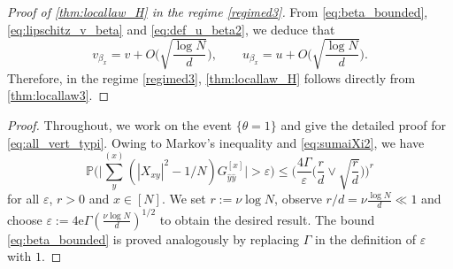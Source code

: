 \documentclass[10pt,a4paper]{amsart}
\newcommand{\eps}{\varepsilon}
\numberwithin{equation}{section}
\newcommand*\bset[1]{[#1]}
\newcommand*\ubarr[1]{{\widehat{#1}}}
\begin{document}
	\begin{proof}[Proof of \cref{thm:locallaw_H} in the regime \eqref{regimed3}] 
	From \eqref{eq:beta_bounded}, \eqref{eq:lipschitz_v_beta} and \eqref{eq:def_u_beta2}, we deduce that 
	\[ v_{\beta_x} = v + O\bigg( \sqrt{\frac{\log N}{d}}\bigg), 
	\qquad u_{\beta_x} = u + O \bigg( \sqrt{\frac{\log N}{d}}\bigg). 
	\]
	Therefore, in the regime \eqref{regimed3}, \cref{thm:locallaw_H} 
	follows directly from \cref{thm:locallaw3}. 
	\end{proof} 

	
	
	\begin{proof}
		Throughout, we work on the event $\{\theta =1\}$ and give the detailed proof for \eqref{eq:all_vert_typi}. Owing to Markov's inequality and \eqref{eq:sumaiXi2}, we have
		\begin{equation*}
			\mathbb{P} \biggl( \biggl|\sum_{y}^{(x)} \left( |X_{xy}|^2 - 1/N \right) G_{\ubarr{y}\ubarr{y}}^{\bset{x}}\biggr| > \eps \biggr) \le \biggl( \frac{4 \Gamma}{\eps} \biggl(\frac{r}{d} \vee \sqrt{\frac{r}{d}} \biggr) \biggr)^r
		\end{equation*}
		for all $\eps$, $r >0$ and $x \in [N]$. We set $r:= \nu \log N$, observe $r/d =  \nu \frac{\log N}{d}\ll 1$ and choose $\eps := 4 \mathrm{e} \Gamma(\frac{\nu\log N}{d})^{1/2} $ to obtain the desired result. The bound \eqref{eq:beta_bounded} is proved analogously by replacing $\Gamma$ in the definition of $\eps$ with $1$.
	\end{proof}

	
	
\end{document}
